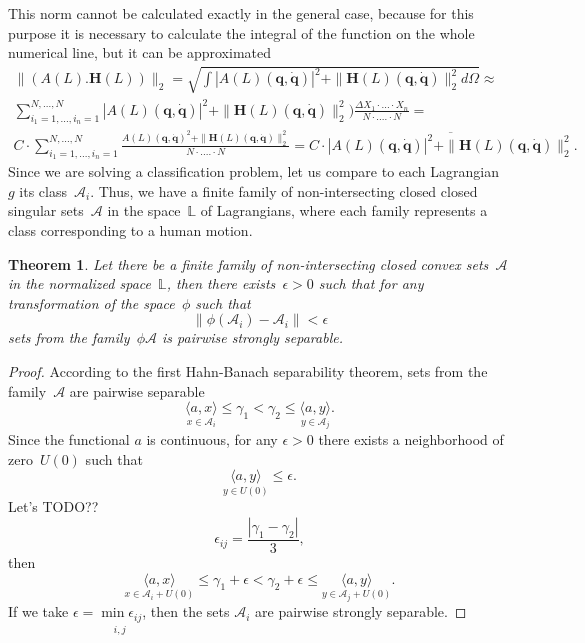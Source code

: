 \documentclass[12pt]{paper}
\newtheorem{theorem}{Theorem}
\newtheorem{proof}{Proof}
\begin{document}
This norm cannot be calculated exactly in the general case, because for this purpose it is
necessary to calculate the integral of the function on the whole numerical line, but it can be
approximated
\[
\begin{split}
\|(A(L). \mathbf{H}(L))\|_2 = \sqrt{\int |A(L)\left(\mathbf{q}, \dot{\mathbf{q}}\right)|^2 + \|\mathbf{H}(L)\left(\mathbf{q}, \dot{\mathbf{q}}\right)\|_2^2  d\Omega} \approx
\\
\sum_{i_1 = 1, ..., i_n = 1}^{N, ..., N} |A(L)\left(\mathbf{q}, \dot{\mathbf{q}}\right)|^2  + \|\mathbf{H}(L)\left(\mathbf{q}, \dot{\mathbf{q}}\right)\|_2^2) \frac{\Delta X_1 \cdot ... \cdot X_n}{N \cdot .... \cdot N} =
\\
C \cdot \sum_{i_1 = 1, ..., i_n = 1}^{N, ..., N} \frac{A(L)\left(\mathbf{q}, \dot{\mathbf{q}}\right)^2 + \|\mathbf{H}(L)\left(\mathbf{q}, \dot{\mathbf{q}}\right)\|_2^2}{N \cdot .... \cdot N} =  C \cdot \overline{|A(L)\left(\mathbf{q}, \dot{\mathbf{q}}\right)|^2 + \|\mathbf{H}(L)\left(\mathbf{q}, \dot{\mathbf{q}}\right)\|_2^2}.
\end{split}
\]
Since we are solving a classification problem, let us compare to each Lagrangian~$g$ its class~$\mathcal{A}_{i}$. Thus, we have a finite family of non-intersecting closed closed singular sets~$\mathcal{A}$ in the space~$\mathbb{L}$ of Lagrangians, where each family represents a class corresponding to a human motion.

\begin{theorem} \label{main_theorem}
Let there be a finite family of non-intersecting closed convex sets~$\mathcal{A}$ in the
normalized space~$\mathbb{L}$, then there exists~$\epsilon > 0$ such that for any transformation of the space~$\phi$ such that 
\[
\|\phi(\mathcal{A}_{i}) - \mathcal{A}_{i}\| < \epsilon
\]
sets from the family~$\phi{\mathcal{A}}$ is pairwise strongly separable.
\end{theorem}

\begin{proof}
According to the first Hahn-Banach separability theorem, sets from the family~$\mathcal{A}$ are
pairwise separable
\[ 
\underset{x \in \mathcal{A}_{i}}{\langle a, x \rangle}\leq \gamma_{1} < \gamma_{2} \leq \underset{y \in \mathcal{A}_{j}}{\langle a, y \rangle}.
\]
Since the functional $a$ is continuous, for any $\epsilon > 0$ there exists a neighborhood of zero~$U(0)$ such that 
\[
\underset{y \in U(0)}{\langle a, y \rangle} \leq \epsilon.
\]
Let's TODO??
\[
\epsilon_{ij} = \frac{|\gamma_{1} - \gamma_{2}|}{3},\]
then
\[
\underset{x \in \mathcal{A}_{i} + U(0)}{\langle a, x \rangle}\leq \gamma_{1} + \epsilon < \gamma_{2} + \epsilon \leq \underset{y \in \mathcal{A}_{j} + U(0)}{\langle a, y \rangle}.\]
If we take $\epsilon = \underset{i, j}{\min{\epsilon_{ij}}}$, then the sets $\mathcal{A}_{i}$ are pairwise strongly separable.
\end{proof}
\end{document}
